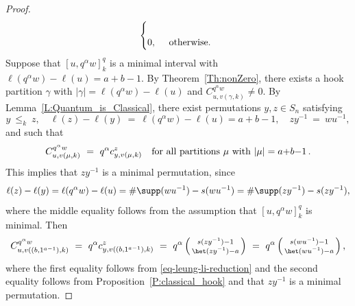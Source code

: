 \begin{proof}
\begin{equation*}
\begin{cases}
            \\
            0, &
            \begin{array}[t]{lr}
                \text{otherwise.}
            \end{array}
        \end{cases}
    \end{equation*}
    Suppose that $[u, q^{\alpha}w]_k^q$ is a minimal interval
    with $\ell(q^\alpha w) - \ell(u) = a{+}b{-}1$.
    By Theorem~\ref{Th:nonZero},
    there exists a hook partition $\gamma$
    with $|\gamma| = \ell(q^\alpha w) - \ell(u)$
    and $C^{q^\alpha w}_{u,v(\gamma,k)} \neq 0$.
    By Lemma~\ref{L:Quantum_is_Classical},
    there exist permutations $y, z \in S_n$ satisfying
    \begin{equation}
        \label{properties-of-y-and-z}
        y\ \leq_k\ z,
        \quad
        \ell(z) - \ell(y)\ =\ \ell(q^\alpha w) - \ell(u) = a{+}b{-}1,
        \quad
        zy^{-1}\ =\ wu^{-1},
    \end{equation}
    and such that
    \begin{equation}
        \label{eq-leung-li-reduction}
        C^{q^\alpha w}_{u,v(\mu,k)}\ =\  q^\alpha c^z_{y,v(\mu,k)}
        \quad \text{for all partitions $\mu$ with $|\mu| = a{+}b{-}1$\,.}
    \end{equation}
    This implies that $z y^{-1}$ is a minimal permutation, since
    \begin{align*}
        \ell(z) - \ell(y)
        = \ell(q^\alpha w) - \ell(u)
        = \#\supp(w u^{-1}) - s(w u^{-1})
        = \#\supp(z y^{-1}) - s(z y^{-1}),
    \end{align*}
    where the middle equality follows from the assumption that
    $[u, q^{\alpha}w]_k^q$ is minimal.
    Then
    \begin{equation}
        C^{q^\alpha w}_{u,v((b, 1^{a-1}),k)}
        \ =\ q^\alpha c^z_{y,v((b, 1^{a-1}),k)}
        \ =\ q^\alpha \left(\begin{smallmatrix} s(zy^{-1})-1 \\ \het(zy^{-1})-a \end{smallmatrix}\right)
        \ =\ q^\alpha \left(\begin{smallmatrix} s(wu^{-1})-1 \\ \het(wu^{-1})-a \end{smallmatrix}\right),
    \end{equation}
    where the first equality follows from \eqref{eq-leung-li-reduction}
    and the second equality follows from Proposition~\ref{P:classical_hook}
    and that $z y^{-1}$ is a minimal permutation.


\end{proof}

